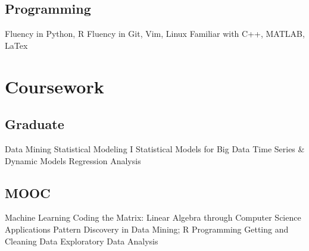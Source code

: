 \documentclass[]{deedy-resume-openfont}
\begin{document}
\begin{minipage}[t]{0.3\textwidth}
\subsection{Programming}
Fluency in Python, R \textbullet{}
Fluency in Git, Vim, Linux \textbullet{}
Familiar with C++, MATLAB, LaTex
\sectionsep


\section{Coursework}
\subsection{Graduate}
Data Mining \textbullet{}
Statistical Modeling I \textbullet{}
Statistical Models for Big Data \textbullet{}
Time Series \& Dynamic Models \textbullet{}
Regression Analysis
\sectionsep

\subsection{MOOC}
Machine Learning \textbullet{}
Coding the Matrix: Linear Algebra through Computer Science Applications
\textbullet{}
Pattern Discovery in Data Mining; \textbullet{}
R Programming \textbullet{}
Getting and Cleaning Data \textbullet{}
Exploratory Data Analysis
\sectionsep


%
%

\end{minipage}
\hfill
\end{document}
